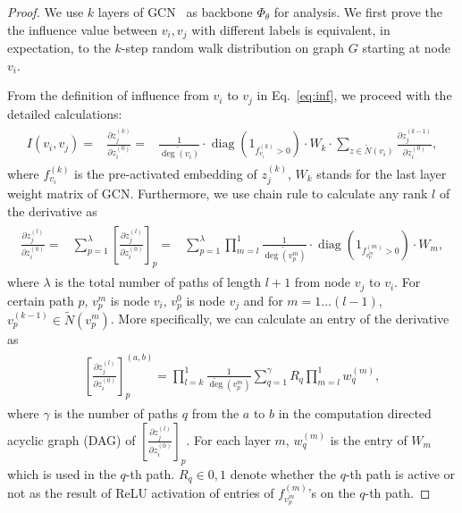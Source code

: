 \begin{proof}
We use $k$ layers of GCN~\cite{kipf2017semisupervised} as backbone $\Phi_\theta$ for analysis. 
We first prove the the influence value between $v_i, v_j$ with different labels is equivalent, in expectation, to the $k$-step random walk distribution on graph $G$ starting at node $v_i$.

From the definition of influence from $v_i$ to $v_j$ in Eq.~\ref{eq:inf}, we proceed with the detailed calculations:
\begin{eqnarray}
\begin{aligned}
\textstyle I(v_i, v_j) =& \frac{\partial z_j^{(k)}}{\partial z_i^{(0)}} 
=& \frac{1}{\widetilde{\operatorname{deg}(v_i)}} \cdot \operatorname{diag}\left(1_{f_{v_i}^{(k)}>0}\right) \cdot W_k \cdot \sum_{z \in \widetilde{N}(v_i)} \frac{\partial z_j^{(k-1)}}{\partial z_i^{(0)}},
\end{aligned}
\end{eqnarray}
where $f_{v_i}^{(k)}$ is the pre-activated embedding of $z_j^{(k)}$, $W_k$ stands for the last layer weight matrix of GCN. 
Furthermore, we use chain rule to calculate any rank $l$ of the derivative as
\begin{eqnarray}
\begin{aligned}
    \frac{\partial z_j^{(l)}}{\partial z_i^{(0)}} 
    =& \sum_{p=1}^{\lambda}\left[\frac{\partial z_j^{(l)}}{\partial z_i^{(0)}}\right]_p 
    =& \sum_{p=1}^{\lambda} \prod_{m=l}^1 \frac{1}{\widetilde{\operatorname{deg}\left(v_p^m\right)}} \cdot \operatorname{diag}\left(1_{f_{v_p^m}^{(m)}>0}\right) \cdot W_m,
\end{aligned}
\end{eqnarray}
where $\lambda$ is the total number of paths of length $l+1$ from node $v_j$ to $v_i$. For certain path $p$, $v_p^m$ is node $v_i$, $v_p^0$ is node $v_j$ and for $m = 1...(l-1)$, $v_p^(k-1) \in \widetilde{N}(v_p^m)$.
More specifically, we can calculate an entry of the derivative as 
\begin{eqnarray}
\begin{aligned}
\left[\frac{\partial z_j^{(l)}}{\partial z_i^{(0)}}\right]_p^{(a, b)}=\prod_{l=k}^1 \frac{1}{\widetilde{\operatorname{deg}}\left(v_p^m\right)} \sum_{q=1}^{\gamma} R_q \prod_{m=l}^1 w_q^{(m)},
\end{aligned}
\end{eqnarray}
where $\gamma$ is the number of paths $q$ from the $a$ to $b$ in the computation directed acyclic graph (DAG) of $\left[\frac{\partial z_j^{(l)}}{\partial z_i^{(0)}}\right]_p$. For each layer $m$, $w_q^{(m)}$ is the entry of $W_m$ which is used in the $q$-th path. $R_q \in {0,1}$ denote whether the $q$-th path is active or not as the result of ReLU activation of entries of $f_{v_p^m}^{(m)}$'s on the $q$-th path.

\end{proof}
